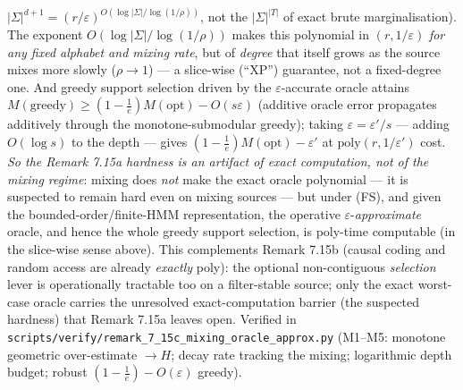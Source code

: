 \documentclass[
]{article}
\begin{document}
$|\Sigma|^{d+1}=(r/\varepsilon)^{O(\log|\Sigma|/\log(1/\rho))}$, not the
$|\Sigma|^{|T|}$ of exact brute marginalisation). The exponent
$O(\log|\Sigma|/\log(1/\rho))$ makes this polynomial in $(r,1/\varepsilon)$ \emph{for
any fixed alphabet and mixing rate}, but of \emph{degree} that itself grows as the
source mixes more slowly ($\rho\to1$) --- a slice-wise (``XP'') guarantee, not a
fixed-degree one. And greedy support selection
driven by the $\varepsilon$-accurate oracle attains $M(\text{greedy})\ge
(1-\tfrac1e)M(\text{opt})-O(s\varepsilon)$ (additive oracle error propagates
additively through the monotone-submodular greedy); taking $\varepsilon=
\varepsilon'/s$ --- adding $O(\log s)$ to the depth --- gives
$(1-\tfrac1e)M(\text{opt})-\varepsilon'$ at $\mathrm{poly}(r,1/\varepsilon')$ cost.
\emph{So the Remark 7.15a hardness is an artifact of \emph{exact} computation, not
of the mixing regime}: mixing does \emph{not} make the exact oracle polynomial ---
it is suspected to remain hard even on mixing sources --- but under (FS), and given
the bounded-order/finite-HMM representation, the operative
$\varepsilon$-\emph{approximate} oracle, and hence the whole greedy support
selection, is poly-time computable (in the slice-wise sense above). This complements
Remark 7.15b (causal coding and random access are already \emph{exactly} poly): the
optional non-contiguous \emph{selection} lever is operationally tractable too on a
filter-stable source; only the exact worst-case oracle carries the unresolved
exact-computation barrier (the suspected hardness) that Remark 7.15a leaves open.
Verified in
\texttt{scripts/verify/remark\_7\_15c\_mixing\_oracle\_approx.py} (M1--M5: monotone
geometric over-estimate $\to H$; decay rate tracking the mixing; logarithmic depth
budget; robust $(1-\tfrac1e)-O(\varepsilon)$ greedy).
\end{document}
